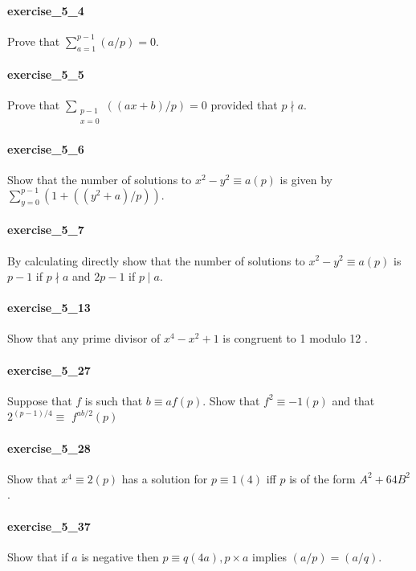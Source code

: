 \documentclass{article}
\begin{document}
\paragraph{exercise\_5\_4} Prove that $\sum_{a=1}^{p-1}(a / p)=0$.

\paragraph{exercise\_5\_5} Prove that $\sum_{\substack{p-1 \\ x=0}}((a x+b) / p)=0$ provided that $p \nmid a .$

\paragraph{exercise\_5\_6} Show that the number of solutions to $x^{2}-y^{2} \equiv a(p)$ is given by $\sum_{y=0}^{p-1}\left(1+\left(\left(y^{2}+a\right) / p\right)\right) .$

\paragraph{exercise\_5\_7} By calculating directly show that the number of solutions to $x^{2}-y^{2} \equiv a(p)$ is $p-1$ if $p \nmid a$ and $2 p-1$ if $p \mid a$.

\paragraph{exercise\_5\_13} Show that any prime divisor of $x^{4}-x^{2}+1$ is congruent to 1 modulo 12 .

\paragraph{exercise\_5\_27} Suppose that $f$ is such that $b \equiv a f(p)$. Show that $f^{2} \equiv-1(p)$ and that $2^{(p-1) / 4} \equiv$ $f^{a b / 2}(p)$

\paragraph{exercise\_5\_28} Show that $x^{4} \equiv 2(p)$ has a solution for $p \equiv 1(4)$ iff $p$ is of the form $A^{2}+64 B^{2}$.

\paragraph{exercise\_5\_37} Show that if $a$ is negative then $p \equiv q(4 a), p \times a$ implies $(a / p)=(a / q)$.
\end{document}
